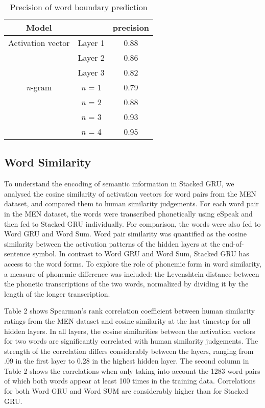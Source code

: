 \begin{table}[]
	\centering
	\begin{tabular}{ccc}
		Model & & precision \\
		\hline
		Activation vector & Layer 1 & 0.88 \\
		& Layer 2 & 0.86 \\
		& Layer 3 & 0.82 \\
		\hline
		\textit{n}-gram & \textit{n} = 1 & 0.79 \\
		& \textit{n} = 2 & 0.88 \\
		& \textit{n} = 3 & 0.93 \\
		& \textit{n} = 4 & 0.95
	\end{tabular}
	\caption{Precision of word boundary prediction}
\end{table}


\subsection{Word Similarity}
To understand the encoding of semantic information in {\sc Stacked GRU}, we analysed the cosine similarity of activation vectors for word pairs from the MEN dataset, and compared them to human similarity judgements.
For each word pair in the MEN dataset, the words were transcribed phonetically using eSpeak and then fed to {\sc Stacked GRU} individually. For comparison, the words were also fed to {\sc Word GRU} and {\sc Word Sum}. Word pair similarity was quantified as the cosine similarity between the activation patterns of the hidden layers at the end-of-sentence symbol.
In contrast to {\sc Word GRU} and {\sc Word Sum}, {\sc Stacked GRU} has access to the word forms. To explore the role of phonemic form in word similarity, a measure of phonemic difference was included: the Levenshtein distance between the phonetic transcriptions of the two words, normalized by dividing it by the length of the longer transcription. 

Table 2 shows Spearman's rank correlation coefficient between human similarity ratings from the MEN dataset and cosine similarity at the last timestep for all hidden layers. In all layers, the cosine similarities between the activation vectors for two words are significantly correlated with human similarity judgements. The strength of the correlation differs considerably between the layers, ranging from .09 in the first layer to 0.28 in the highest hidden layer. The second column in Table 2 shows the correlations when only taking into account the 1283 word pairs of which both words appear at least 100 times in the training data. 
Correlations for both {\sc Word GRU} and {\sc Word SUM} are considerably higher than for {\sc Stacked GRU}.

